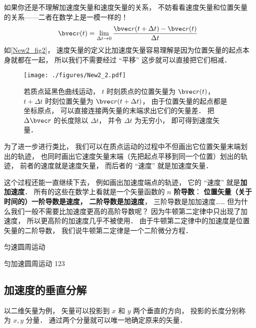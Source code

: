 如果你还是不理解加速度矢量和速度矢量的关系， 不妨看看速度矢量和位置矢量的关系——二者在数学上是一模一样的！
\begin{equation}
\bvec v(t) = \lim_{\Delta t\to 0}\frac{\bvec r(t+\Delta t) - \bvec r(t)}{\Delta t}
\end{equation}
如\autoref{New2_fig2}， 速度矢量的定义比加速度矢量容易理解是因为位置矢量的起点本身就都在一起， 所以我们不需要经过 “平移” 这步就可以直接把它们相减．
\begin{figure}[ht]
\centering
\texttt{[image: ./figures/New2\_2.pdf]}
\caption{若质点延黑色曲线运动， $t$ 时刻质点的位置矢量为 $\bvec r(t)$，$t+\Delta t$ 时刻位置矢量为 $\bvec r(t+\Delta t)$， 由于位置矢量的起点都是坐标原点， 可以直接连接两矢量的末端求出它们的矢量差． 把 $\Delta \bvec r$ 的长度除以 $\Delta t$， 并令 $\Delta t$ 为无穷小， 即可得到速度矢量．} \label{New2_fig2}
\end{figure}

为了进一步进行类比， 我们可以在质点运动的过程中不但画出它位置矢量末端划出的轨迹， 也同时画出它速度矢量末端（先把起点平移到同一个位置）划出的轨迹， 前者的速度就是速度矢量， 而后者的 “速度” 就是加速度矢量．

这个过程还能一直继续下去， 例如画出加速度端点的轨迹， 它的 “速度” 就是\textbf{加加速度}． 所有的这些在数学上看就是一个矢量函数的\textbf{ $n$ 阶导数}： \textbf{位置矢量（关于时间的）一阶导数是速度， 二阶导数是加速度}， 三阶导数是加加速度…… 但为什么我们一般不需要比加速度更高的高阶导数呢？ 因为牛顿第二定律中只出现了加速度， 所以更高阶的加速度几乎不被使用． 由于牛顿第二定律中的加速度是位置矢量的二阶导数， 我们说牛顿第二定律是一个二阶微分方程．

\begin{example}{匀速圆周运动}
\end{example}

\begin{example}{匀加速圆周运动}
123
\end{example}

\subsection{加速度的垂直分解}

以二维矢量为例， 矢量可以投影到 $x$ 和 $y$ 两个垂直的方向， 投影的长度分别称为 $x, y$ 分量． 通过两个分量就可以唯一地确定原来的矢量．


